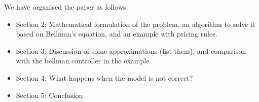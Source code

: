 \documentclass[main.tex]{subfiles}
\begin{document}
We have organised the paper as follows:
\begin{itemize}
\item Section 2: Mathematical formulation of the problem, an algorithm
  to solve it based on Bellman's equation, and an example with pricing rules.
\item Section 3: Discussion of some approximations (list them), and
  comparison with the bellman controller in the example
\item Section 4: What happens when the model is not correct?
\item Section 5: Conclusion
\end{itemize}


\biblio
\end{document}
